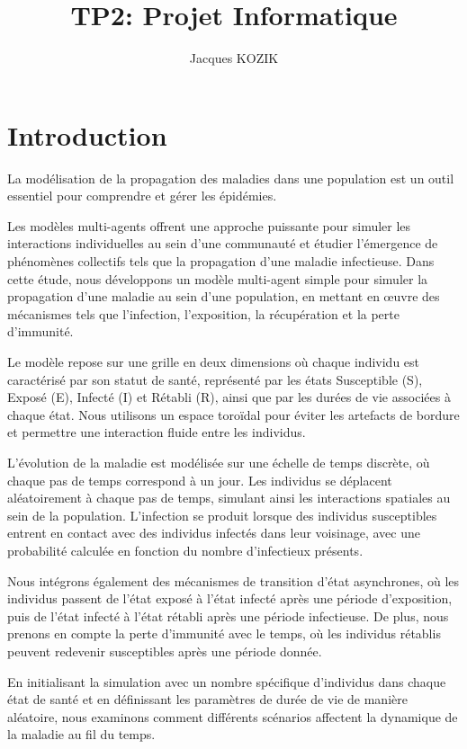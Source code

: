 \documentclass[french]{article}
\title{TP2: Projet Informatique }
\author{Jacques KOZIK}
\begin{document}
\maketitle
\newpage

\tableofcontents
\newpage
\section{Introduction}

La modélisation de la propagation des maladies dans une population est un outil essentiel pour comprendre et gérer les épidémies. 

Les modèles multi-agents offrent une approche puissante pour simuler les interactions individuelles au sein d'une communauté et étudier l'émergence de phénomènes collectifs tels que la propagation d'une maladie infectieuse. Dans cette étude, nous développons un modèle multi-agent simple pour simuler la propagation d'une maladie au sein d'une population, en mettant en œuvre des mécanismes tels que l'infection, l'exposition, la récupération et la perte d'immunité.

Le modèle repose sur une grille en deux dimensions où chaque individu est caractérisé par son statut de santé, représenté par les états Susceptible (S), Exposé (E), Infecté (I) et Rétabli (R), ainsi que par les durées de vie associées à chaque état. Nous utilisons un espace toroïdal pour éviter les artefacts de bordure et permettre une interaction fluide entre les individus.

L'évolution de la maladie est modélisée sur une échelle de temps discrète, où chaque pas de temps correspond à un jour. Les individus se déplacent aléatoirement à chaque pas de temps, simulant ainsi les interactions spatiales au sein de la population. L'infection se produit lorsque des individus susceptibles entrent en contact avec des individus infectés dans leur voisinage, avec une probabilité calculée en fonction du nombre d'infectieux présents.

Nous intégrons également des mécanismes de transition d'état asynchrones, où les individus passent de l'état exposé à l'état infecté après une période d'exposition, puis de l'état infecté à l'état rétabli après une période infectieuse. De plus, nous prenons en compte la perte d'immunité avec le temps, où les individus rétablis peuvent redevenir susceptibles après une période donnée.

En initialisant la simulation avec un nombre spécifique d'individus dans chaque état de santé et en définissant les paramètres de durée de vie de manière aléatoire, nous examinons comment différents scénarios affectent la dynamique de la maladie au fil du temps.
\end{document}
